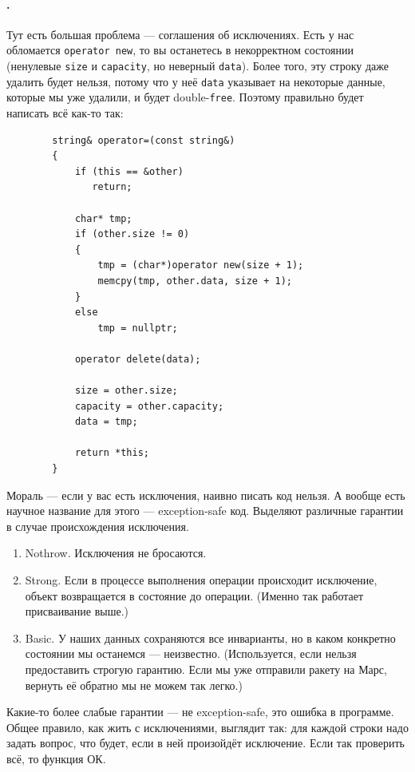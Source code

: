 \documentclass{article}
\begin{document}
    \paragraph{.}
    Тут есть большая проблема --- соглашения об исключениях. Есть у нас обломается \texttt{operator new}, то вы останетесь в некорректном состоянии (ненулевые \texttt{size} и \texttt{capacity}, но неверный \texttt{data}). Более того, эту строку даже удалить будет нельзя, потому что у неё \texttt{data} указывает на некоторые данные, которые мы уже удалили, и будет double-\texttt{free}. Поэтому правильно будет написать всё как-то так:
    \begin{verbatim}
        string& operator=(const string&)
        {
            if (this == &other)
               return;

            char* tmp;
            if (other.size != 0)
            {
                tmp = (char*)operator new(size + 1);
                memcpy(tmp, other.data, size + 1);
            }
            else
                tmp = nullptr;

            operator delete(data);
            
            size = other.size;
            capacity = other.capacity;
            data = tmp;

            return *this;
        }
    \end{verbatim}
    Мораль --- если у вас есть исключения, наивно писать код нельзя. А вообще есть научное название для этого --- exception-safe код. Выделяют различные гарантии в случае происхождения исключения.
    \begin{enumerate}
        \item Nothrow. Исключения не бросаются.
        \item Strong. Если в процессе выполнения операции происходит исключение, объект возвращается в состояние до операции. (Именно так работает присваивание выше.)
        \item Basic. У наших данных сохраняются все инварианты, но в каком конкретно состоянии мы останемся --- неизвестно. (Используется, если нельзя предоставить строгую гарантию. Если мы уже отправили ракету на Марс, вернуть её обратно мы не можем так легко.)
    \end{enumerate}
    Какие-то более слабые гарантии --- не exception-safe, это ошибка в программе. Общее правило, как жить с исключениями, выглядит так: для каждой строки надо задать вопрос, что будет, если в ней произойдёт исключение. Если так проверить всё, то функция ОК.\\
\end{document}

